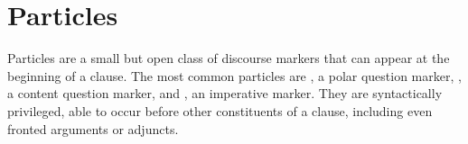 \setchapterpreamble[u]{\margintoc}
\chapter{Particles}
Particles are a small but open class of discourse markers that can appear at the beginning of a clause. The most common particles are , a polar question marker, , a content question marker, and , an imperative marker. They are syntactically privileged, able to occur before other constituents of a clause, including even fronted arguments or adjuncts.






